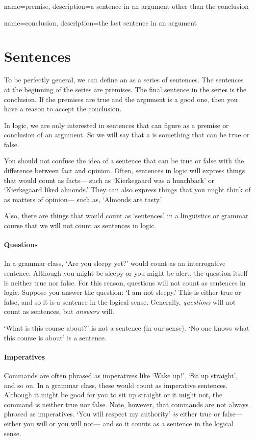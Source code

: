 {
name=premise,
description={a sentence in an \gls{argument} other than the \gls{conclusion}}
}

{
name=conclusion,
description={the last sentence in an \gls{argument}}
}


\section{Sentences}
\label{intro.sentences}

To be perfectly general, we can define an  as a series of sentences. The sentences at the beginning of the series are premises. The final sentence in the series is the conclusion. If the premises are true and the argument is a good one, then you have a reason to accept the conclusion.

In logic, we are only interested in sentences that can figure as a premise or conclusion of an argument. So we will say that a  is something that can be true or false.

You should not confuse the idea of a sentence that can be true or false with the difference between fact and opinion. Often, sentences in logic will express things that would count as facts--- such as `Kierkegaard was a hunchback' or `Kierkegaard liked almonds.' They can also express things that you might think of as matters of opinion--- such as, `Almonds are tasty.'

Also, there are things that would count as `sentences' in a linguistics or grammar course that we will not count as sentences in logic.

\paragraph{Questions} In a grammar class, `Are you sleepy yet?' would count as an interrogative sentence. Although you might be sleepy or you might be alert, the question itself is neither true nor false. For this reason, questions will not count as sentences in logic. Suppose you answer the question: `I am not sleepy.' This is either true or false, and so it is a sentence in the logical sense. Generally, \emph{questions} will not count as sentences, but \emph{answers} will. 

`What is this course about?' is not a sentence (in our sense). `No one knows what this course is about' is a sentence.

\paragraph{Imperatives} Commands are often phrased as imperatives like `Wake up!', `Sit up straight', and so on. In a grammar class, these would count as imperative sentences. Although it might be good for you to sit up straight or it might not, the command is neither true nor false. Note, however, that commands are not always phrased as imperatives. `You will respect my authority' \emph{is} either true or false--- either you will or you will not--- and so it counts as a sentence in the logical sense.

